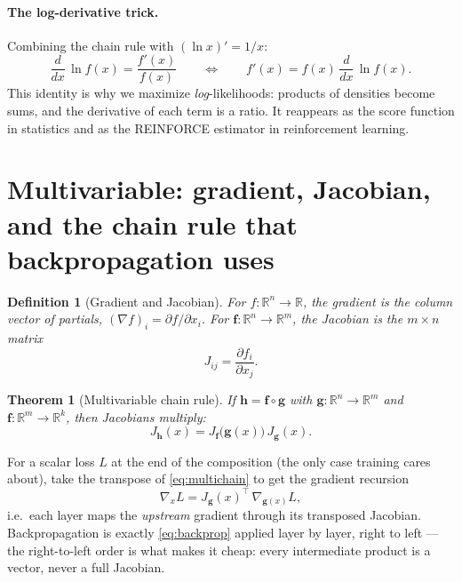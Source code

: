 \documentclass[11pt]{article}
\newtheorem{theorem}{Theorem}
\newtheorem{definition}{Definition}
\begin{document}
\paragraph{The log-derivative trick.} Combining the chain rule with
$(\ln x)' = 1/x$:
\begin{equation}
  \frac{d}{dx}\,\ln f(x) = \frac{f'(x)}{f(x)}
  \qquad\Longleftrightarrow\qquad
  f'(x) = f(x)\,\frac{d}{dx}\,\ln f(x).
  \label{eq:logderiv}
\end{equation}
This identity is why we maximize \emph{log}-likelihoods: products of
densities become sums, and the derivative of each term is a ratio. It
reappears as the score function in statistics and as the REINFORCE
estimator in reinforcement learning.

\section{Multivariable: gradient, Jacobian, and the chain rule that
backpropagation uses}

\begin{definition}[Gradient and Jacobian]
For $f : \mathbb{R}^n \to \mathbb{R}$, the gradient is the column vector
of partials, $(\nabla f)_i = \partial f / \partial x_i$. For
$\mathbf{f} : \mathbb{R}^n \to \mathbb{R}^m$, the Jacobian is the
$m \times n$ matrix
\begin{equation}
  J_{ij} = \frac{\partial f_i}{\partial x_j}.
  \label{eq:jacobian}
\end{equation}
\end{definition}

\begin{theorem}[Multivariable chain rule]
If $\mathbf{h} = \mathbf{f} \circ \mathbf{g}$ with
$\mathbf{g} : \mathbb{R}^n \to \mathbb{R}^m$ and
$\mathbf{f} : \mathbb{R}^m \to \mathbb{R}^k$, then Jacobians
\emph{multiply}:
\begin{equation}
  J_{\mathbf{h}}(x) = J_{\mathbf{f}}\bigl(\mathbf{g}(x)\bigr)\,
  J_{\mathbf{g}}(x).
  \label{eq:multichain}
\end{equation}
\end{theorem}

For a scalar loss $L$ at the end of the composition (the only case
training cares about), take the transpose of \eqref{eq:multichain} to
get the gradient recursion
\begin{equation}
  \nabla_x L = J_{\mathbf{g}}(x)^{\top}\,\nabla_{\mathbf{g}(x)} L ,
  \label{eq:backprop}
\end{equation}
i.e.\ each layer maps the \emph{upstream} gradient through its
transposed Jacobian. Backpropagation is exactly
\eqref{eq:backprop} applied layer by layer, right to left --- the
right-to-left order is what makes it cheap: every intermediate product
is a vector, never a full Jacobian.
\end{document}

